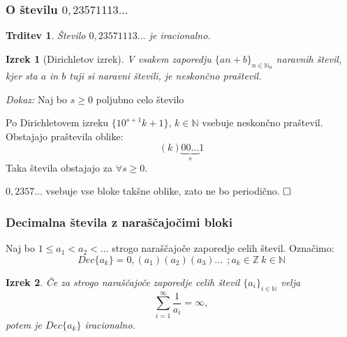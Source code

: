 \documentclass{beamer}
\def\N{\mathbb{N}} %
\def\Z{\mathbb{Z}} %
\def\qed{$\hfill\Box$}   %
\newtheorem{izrek}{Izrek}
\newtheorem{trditev}{Trditev}
\begin{document}
\begin{frame}
    \frametitle{O številu $0,23571113\dots$}
    \begin{trditev}
        Število $0,23571113 \dots$ je iracionalno.
    \end{trditev}

    \pause
    \begin{izrek}[Dirichletov izrek]
        \label{Dirichletov izrek}
        V vsakem zaporedju $ \lbrace an + b \rbrace_{n \in \N_0}$ naravnih števil, kjer sta $a$ in $b$
        tuji si naravni števili, je neskončno praštevil.
    \end{izrek}
    \pause
    \emph{Dokaz:} Naj bo $s \geq 0$ poljubno celo število
    
    Po Dirichletovem izreku $ \{10^{s+1}k + 1\}$, $k \in \N$ vsebuje neskončno praštevil.
    \pause
    Obstajajo praštevila oblike:
    \[(k)\underbrace{00 \dots}_{s}1\]
    \pause
    Taka števila obstajajo za $\forall s \geq 0$.
    
    $0,2357\dots$ vsebuje vse bloke takšne oblike, zato ne bo periodično.
    \qed

\end{frame}


\begin{frame}
    \frametitle{Decimalna števila z naraščajočimi bloki}

    Naj bo $1 \leq a_1 < a_2 < \dots $ strogo naraščajoče zaporedje celih števil. 
    Označimo: \[Dec\{a_k\} = 0,(a_1)(a_2)(a_3)... \  \ ;  a_k \in \Z \ k \in \N \]
    \pause


    \begin{izrek}\label{izrek1clanek1}
        Če za strogo naraščajoče zaporedje celih števil $\{a_i\}_{i \in \N}$ velja 
        \[ \sum_{i=1}^{\infty} \frac{1}{a_i} = \infty ,\]
        potem je $Dec\{a_k\}$ iracionalno.
    \end{izrek}

\end{frame}
\end{document}
